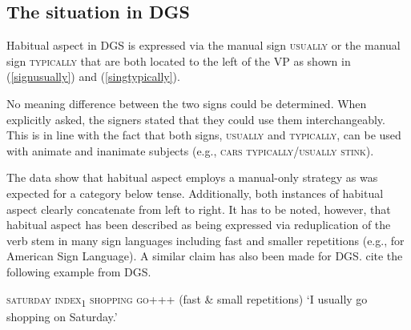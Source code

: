 \subsection{The situation in DGS}
Habitual aspect in DGS is expressed via the manual sign \textsc{usually} or the manual sign \textsc{typically} that are both located to the left of the VP as shown in (\ref{signusually}) and (\ref{singtypically}).

\begin{exe}
\ex\label{signusually}\begin{xlist} 
\end{xlist}
\end{exe} 


\begin{exe}
\ex\label{singtypically}\begin{xlist} 
\end{xlist}
\end{exe} 

\noindent No meaning difference between the two signs could be determined. When explicitly asked, the signers stated that they could use them interchangeably. This is in line with the fact that both signs, \textsc{usually} and \textsc{typically}, can be used with animate and inanimate subjects (e.g., \textsc{cars typically/usually stink}). 

The data show that habitual aspect employs a manual-only strategy as was expected for a category below tense. Additionally, both instances of habitual aspect clearly concatenate from left to right. It has to be noted, however, that habitual aspect has been described as being expressed via reduplication of the verb stem in many sign languages including fast and smaller repetitions (e.g., \citealt{rathmann2005event} for American Sign Language). A similar claim has also been made for DGS. \citet[225]{signgram2017} cite the following example from DGS.

\begin{exe}
\ex \textsc{saturday index\textsubscript{1} shopping go+++} (fast \& small repetitions) 
\glt `I usually go shopping on Saturday.'\label{queretaldgs}
\end{exe}


